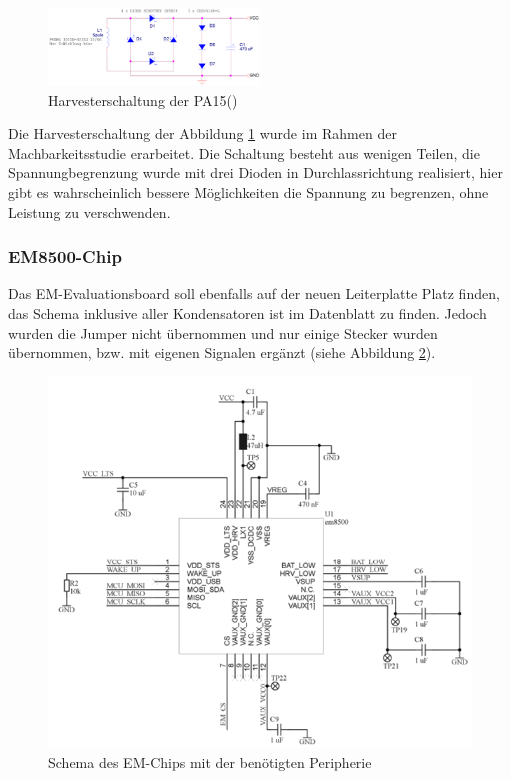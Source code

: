 \begin{figure}[ht]
    \includegraphics[width=0.5\textwidth]{3Vorgehen/imag/Schema_Harvester_PA.png}
    \caption{Harvesterschaltung der PA15(\cite{PA_bicycle})}
    \label{schema_harvester_pa15} 
\end{figure}

Die Harvesterschaltung der Abbildung \ref{schema_harvester_pa15} wurde im Rahmen der Machbarkeitsstudie erarbeitet. Die Schaltung besteht aus wenigen Teilen, die Spannungbegrenzung wurde mit drei Dioden in Durchlassrichtung realisiert, hier gibt es wahrscheinlich bessere Möglichkeiten die Spannung zu begrenzen, ohne Leistung zu verschwenden.

\subsubsection{EM8500-Chip}

Das EM-Evaluationsboard soll ebenfalls auf der neuen Leiterplatte Platz finden, das Schema inklusive aller Kondensatoren ist im Datenblatt zu finden. Jedoch wurden die Jumper nicht übernommen und nur einige Stecker wurden übernommen, bzw. mit eigenen Signalen ergänzt (siehe Abbildung \ref{schema_em-chip_inkl_peripherie}).


\begin{figure}[ht]
    \includegraphics[width=1.0\textwidth]{3Vorgehen/imag/Schema_EM-Chip_inkl_Peripherie.png}
    \caption{Schema des EM-Chips mit der benötigten Peripherie}\label{schema_em-chip_inkl_peripherie} 
\end{figure}


